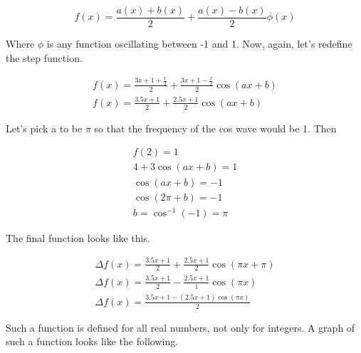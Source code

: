 \documentclass{article}
\begin{document}
\begin{equation}
  f(x) = \frac{a(x) + b(x)}{2} + \frac{a(x) - b(x)}{2}\phi(x)
\end{equation}

Where \(\phi\) is any function oscillating between -1 and 1. Now, again, let's redefine the step function.

\begin{gather}
  f(x) = \frac{3x + 1 + \frac{x}{2}}{2} + \frac{3x + 1 - \frac{x}{2}}{2} \cos(ax + b) \nonumber \\
  f(x) = \frac{3.5x + 1}{2} + \frac{2.5x + 1}{2} \cos(ax + b) \nonumber
\end{gather}

Let's pick a to be \(\pi\) so that the frequency of the cos wave would be 1. Then

\begin{gather}
  f(2) = 1 \nonumber \\
  4 + 3 \cos(ax + b) = 1 \nonumber \\
  \cos(ax + b) = -1 \nonumber \\
  \cos(2\pi + b) = -1 \nonumber \\
  b = \cos^{-1}(-1) = \pi \nonumber
\end{gather}

The final function looks like this.

\begin{gather}
  \Delta f(x) = \frac{3.5x + 1}{2} + \frac{2.5x + 1}{2} \cos(\pi x + \pi) \\
  \Delta f(x) = \frac{3.5x + 1}{2} - \frac{2.5x + 1}{1} \cos(\pi x) \\
  \Delta f(x) = \frac{3.5x + 1 - (2.5x + 1)\cos(\pi x)}{2}
\end{gather}

Such a function is defined for all real numbers, not only for integers. A graph of such a function looks like the following.

\vspace{12pt}

\begin{center}
\end{center}
\end{document}
